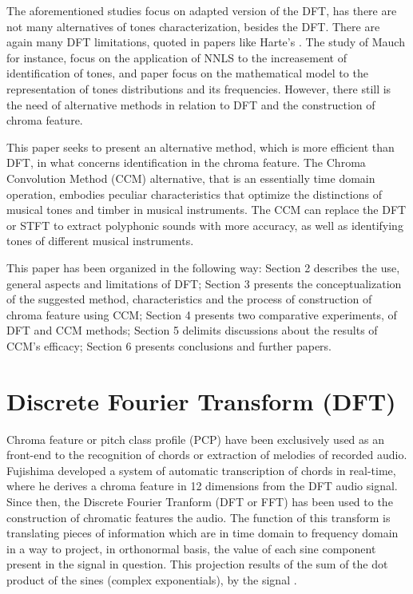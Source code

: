 \documentclass{article}
\begin{document}
The aforementioned studies focus on adapted version of the DFT, has there are not many alternatives of tones characterization, besides the DFT. There are again many DFT limitations, quoted in papers like Harte's \cite{harte2010towards}. The study of Mauch \cite{mauch2010approximate} for instance, focus on the application of NNLS to the increasement of identification of tones, and paper \cite{wakefield1999mathematical} focus on the mathematical model to the representation of tones distributions and its frequencies. However, there still is the need of alternative methods in relation to DFT and the construction of chroma feature.

This paper seeks to present an alternative method, which is more efficient than DFT, in what concerns identification in the chroma feature. The Chroma Convolution Method (CCM) alternative, that is an essentially time domain operation, embodies peculiar characteristics that optimize the distinctions of musical tones and timber in musical instruments. The CCM can replace the DFT or STFT to extract polyphonic sounds with more accuracy, as well as identifying tones of different musical instruments.

	This paper has been organized in the following way: Section 2 describes the use, general aspects and limitations of DFT; Section 3 presents the conceptualization of the suggested method, characteristics and the process of construction of chroma feature using CCM; Section 4 presents two comparative experiments, of DFT and CCM methods; Section 5 delimits discussions about the results of CCM's efficacy; Section 6 presents conclusions and further papers. 

\section{Discrete Fourier Transform (DFT)}\label{sec:sfft}

	Chroma feature or pitch class profile (PCP) have been exclusively used as an front-end to the recognition of chords or extraction of melodies of recorded audio. Fujishima \cite{fujishima1999realtime} developed a system of automatic transcription of chords in real-time, where he derives a chroma feature in 12 dimensions from the DFT audio signal. Since then, the Discrete Fourier Tranform (DFT or FFT) has been used to the construction of chromatic features the audio. The function of this transform is translating pieces of information which are in time domain to frequency domain in a way to project, in orthonormal basis, the value of each sine component present in the signal in question. This projection results of the sum of the dot product of the sines (complex exponentials), by the signal \cite{vaidyanathan1993multirate}.
\end{document}
